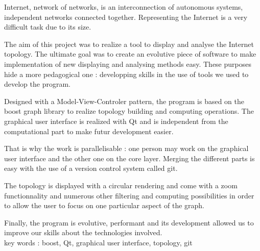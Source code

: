 Internet, network of networks, is an interconnection of autonomous systems, independent networks connected together. Representing the Internet is a very difficult task due to its size.

The aim of this project was to realize a tool to display and analyse the Internet topology. The ultimate goal was to create an evolutive piece of software to make implementation of new displaying and analysing methods easy. These purposes hide a more pedagogical one : developping skills in the use of tools we used to develop the program.

Designed with a Model-View-Controler pattern, the program is based on the boost graph library to realize topology building and computing operations. The graphical user interface is realized with Qt and is independent from the computational part to make futur development easier.

That is why the work is parallelisable : one person may work on the graphical user interface and the other one on the core layer. Merging the different parts is easy with the use of a version control system called git.

The topology is displayed with a circular rendering and come with a zoom functionnality and numerous other filtering and computing possibilities in order to allow the user to focus on one particular aspect of the graph.

Finally, the program is evolutive, performant and its development allowed us to improve our skills about the technologies involved.\\

key words : boost, Qt, graphical user interface, topology, git

